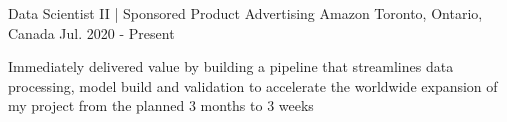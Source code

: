 

\begin{cventries}
\cventry
    {Data Scientist II | Sponsored Product Advertising} %
    {Amazon} %
    {Toronto, Ontario, Canada} %
    {Jul. 2020 - Present} %
    {
      \begin{cvitems} %
        \item {Immediately delivered value by building a pipeline that streamlines data processing, model build and validation to accelerate the worldwide expansion of my project from the planned 3 months to 3 weeks}
      \end{cvitems}
    }

\end{cventries}


